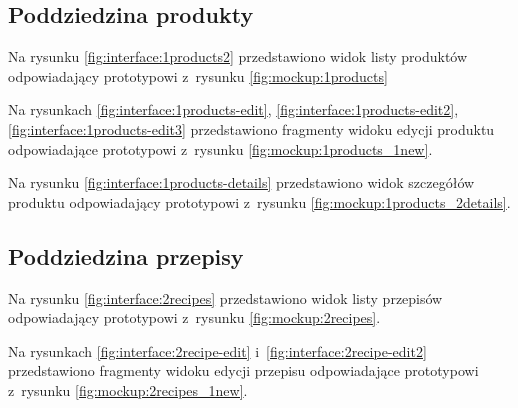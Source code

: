 
\subsection{Poddziedzina produkty}

Na rysunku \ref{fig:interface:1products2} przedstawiono widok listy produktów odpowiadający prototypowi z~rysunku \ref{fig:mockup:1products}


Na rysunkach \ref{fig:interface:1products-edit}, \ref{fig:interface:1products-edit2}, \ref{fig:interface:1products-edit3} przedstawiono fragmenty widoku edycji produktu odpowiadające prototypowi z~rysunku \ref{fig:mockup:1products_1new}.




Na rysunku \ref{fig:interface:1products-details} przedstawiono widok szczegółów produktu odpowiadający prototypowi z~rysunku \ref{fig:mockup:1products_2details}.


\subsection{Poddziedzina przepisy}

Na rysunku \ref{fig:interface:2recipes} przedstawiono widok listy przepisów odpowiadający prototypowi z~rysunku \ref{fig:mockup:2recipes}.


Na rysunkach \ref{fig:interface:2recipe-edit} i~\ref{fig:interface:2recipe-edit2} przedstawiono fragmenty widoku edycji przepisu odpowiadające prototypowi z~rysunku \ref{fig:mockup:2recipes_1new}.


